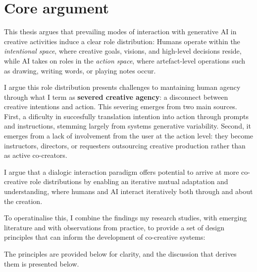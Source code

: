 \section{Core argument}

This thesis argues that prevailing modes of interaction with generative AI in creative activities induce a clear role distribution: Humans operate within the \textit{intentional space}, where creative goals, visions, and high-level decisions reside, while AI takes on roles in the \textit{action space}, where artefact-level operations such as drawing, writing words, or playing notes occur.

I argue this role distribution presents challenges to mantaining human agency through what I term as \textbf{severed creative agency}: a disconnect between creative intentions and action. This severing emerges from two main sources. First, a dificulty in succesfully translation intention into action through prompts and instructions, stemming largely from systems generative variability. Second, it emerges from a lack of involvement from the user at the action level: they become instructors, directors, or requesters outsourcing creative production rather than as active co-creators. 

I argue that a dialogic interaction paradigm offers potential to arrive at more co-creative role distributions by enabling an iterative mutual adaptation and understanding, where humans and AI interact iteratively both through and about the creation. 

To operatinalise this, I combine the findings my research studies, with emerging literature and with observations from practice, to provide a set of design principles that can inform the development of co-creative systems: 

The principles are provided below for clarity, and the discussion that derives them is presented below. 


